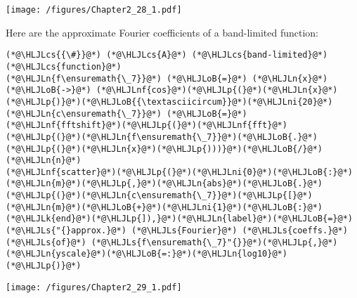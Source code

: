 \documentclass[12pt,landscape]{article}
\newcommand{\HLJLk}[1]{\textcolor[RGB]{148,91,176}{\textbf{#1}}}
\newcommand{\HLJLn}[1]{#1}
\newcommand{\HLJLnf}[1]{\textcolor[RGB]{66,102,213}{#1}}
\newcommand{\HLJLs}[1]{\textcolor[RGB]{201,61,57}{#1}}
\newcommand{\HLJLni}[1]{\textcolor[RGB]{59,151,46}{#1}}
\newcommand{\HLJLoB}[1]{\textcolor[RGB]{102,102,102}{\textbf{#1}}}
\newcommand{\HLJLp}[1]{#1}
\newcommand{\HLJLcs}[1]{\textcolor[RGB]{153,153,119}{\textit{#1}}}
\begin{document}
{\texttt{[image: /figures/Chapter2\_28\_1.pdf]}

Here are the approximate Fourier coefficients of a band-limited function:


\begin{lstlisting}
(*@\HLJLcs{{\#}}@*) (*@\HLJLcs{A}@*) (*@\HLJLcs{band-limited}@*) (*@\HLJLcs{function}@*)
(*@\HLJLn{f\ensuremath{\_7}}@*) (*@\HLJLoB{=}@*) (*@\HLJLn{x}@*) (*@\HLJLoB{->}@*) (*@\HLJLnf{cos}@*)(*@\HLJLp{(}@*)(*@\HLJLn{x}@*)(*@\HLJLp{)}@*)(*@\HLJLoB{{\textasciicircum}}@*)(*@\HLJLni{20}@*)
(*@\HLJLn{c\ensuremath{\_7}}@*) (*@\HLJLoB{=}@*) (*@\HLJLnf{fftshift}@*)(*@\HLJLp{(}@*)(*@\HLJLnf{fft}@*)(*@\HLJLp{(}@*)(*@\HLJLn{f\ensuremath{\_7}}@*)(*@\HLJLoB{.}@*)(*@\HLJLp{(}@*)(*@\HLJLn{x}@*)(*@\HLJLp{)))}@*)(*@\HLJLoB{/}@*)(*@\HLJLn{n}@*)
(*@\HLJLnf{scatter}@*)(*@\HLJLp{(}@*)(*@\HLJLni{0}@*)(*@\HLJLoB{:}@*)(*@\HLJLn{m}@*)(*@\HLJLp{,}@*)(*@\HLJLn{abs}@*)(*@\HLJLoB{.}@*)(*@\HLJLp{(}@*)(*@\HLJLn{c\ensuremath{\_7}}@*)(*@\HLJLp{[}@*)(*@\HLJLn{m}@*)(*@\HLJLoB{+}@*)(*@\HLJLni{1}@*)(*@\HLJLoB{:}@*)(*@\HLJLk{end}@*)(*@\HLJLp{]),}@*)(*@\HLJLn{label}@*)(*@\HLJLoB{=}@*)(*@\HLJLs{"{}approx.}@*) (*@\HLJLs{Fourier}@*) (*@\HLJLs{coeffs.}@*) (*@\HLJLs{of}@*) (*@\HLJLs{f\ensuremath{\_7}"{}}@*)(*@\HLJLp{,}@*)(*@\HLJLn{yscale}@*)(*@\HLJLoB{=:}@*)(*@\HLJLn{log10}@*)(*@\HLJLp{)}@*)
\end{lstlisting}

\texttt{[image: /figures/Chapter2\_29\_1.pdf]}

}
\end{document}
